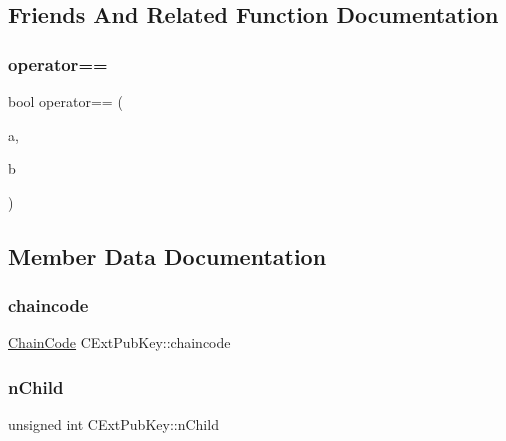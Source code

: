 \subsection{Friends And Related Function Documentation}
\mbox{\label{struct_c_ext_pub_key_a21fdc5351d6df62ce501f57bc1e1c9e6}} 
\subsubsection{\texorpdfstring{operator==}{operator==}}
{\footnotesize\ttfamily bool operator== (\begin{DoxyParamCaption}\item[{const \mbox{\hyperlink{struct_c_ext_pub_key}{C\+Ext\+Pub\+Key}} \&}]{a,  }\item[{const \mbox{\hyperlink{struct_c_ext_pub_key}{C\+Ext\+Pub\+Key}} \&}]{b }\end{DoxyParamCaption})\hspace{0.3cm}{\ttfamily [friend]}}



\subsection{Member Data Documentation}
\mbox{\label{struct_c_ext_pub_key_a2a61ccbe1bc8ddc0e5f7bf5972907760}} 
\subsubsection{\texorpdfstring{chaincode}{chaincode}}
{\footnotesize\ttfamily \mbox{\hyperlink{hash_8h_aa201a9867f780a040c7af908e0a85db3}{Chain\+Code}} C\+Ext\+Pub\+Key\+::chaincode}

\mbox{\label{struct_c_ext_pub_key_af816bc2798e9d9aaa94f56af4775d9bf}} 
\subsubsection{\texorpdfstring{n\+Child}{nChild}}
{\footnotesize\ttfamily unsigned int C\+Ext\+Pub\+Key\+::n\+Child}

